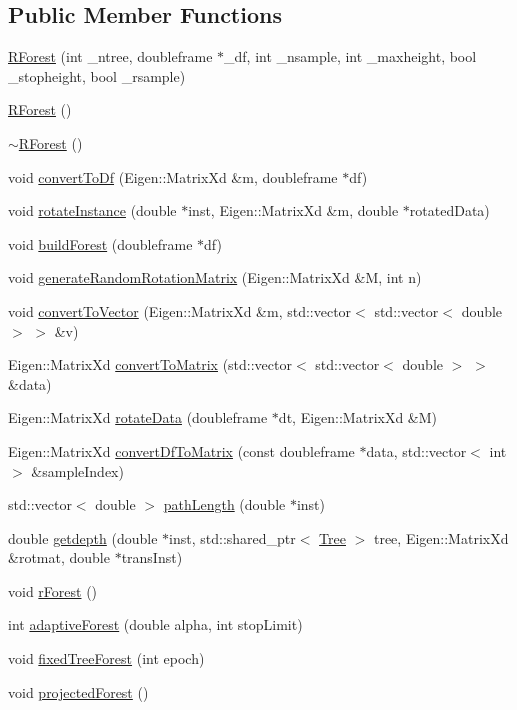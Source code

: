 \subsection*{Public Member Functions}
\begin{DoxyCompactItemize}
\item 
\hyperlink{classRForest_a3314b007aa19d928f56f4bbaf35fae10}{R\+Forest} (int \+\_\+ntree, doubleframe $\ast$\+\_\+df, int \+\_\+nsample, int \+\_\+maxheight, bool \+\_\+stopheight, bool \+\_\+rsample)
\item 
\hyperlink{classRForest_a6058c1b7beb5c90e59e558847b8650f6}{R\+Forest} ()
\item 
\hyperlink{classRForest_a873a1b941163b4cccda4bf83607226f3}{$\sim$\+R\+Forest} ()
\item 
void \hyperlink{classRForest_a0d8c5dbc04ec8433403f40d289d28100}{convert\+To\+Df} (Eigen\+::\+Matrix\+Xd \&m, doubleframe $\ast$df)
\item 
void \hyperlink{classRForest_a068f39ee76aa3ece35f110975303f07b}{rotate\+Instance} (double $\ast$inst, Eigen\+::\+Matrix\+Xd \&m, double $\ast$rotated\+Data)
\item 
void \hyperlink{classRForest_a7e8959b5b54b454f34ed68d60132e80f}{build\+Forest} (doubleframe $\ast$df)
\item 
void \hyperlink{classRForest_ab1f0edda495b87ef9286907d44f2f8ff}{generate\+Random\+Rotation\+Matrix} (Eigen\+::\+Matrix\+Xd \&M, int n)
\item 
void \hyperlink{classRForest_ada11eb452d05c98cd481b9080a5703a3}{convert\+To\+Vector} (Eigen\+::\+Matrix\+Xd \&m, std\+::vector$<$ std\+::vector$<$ double $>$ $>$ \&v)
\item 
Eigen\+::\+Matrix\+Xd \hyperlink{classRForest_ad132bc186056d96d8979fbe238afe529}{convert\+To\+Matrix} (std\+::vector$<$ std\+::vector$<$ double $>$ $>$ \&data)
\item 
Eigen\+::\+Matrix\+Xd \hyperlink{classRForest_af149cda8d70a254ff0968d350f85b59d}{rotate\+Data} (doubleframe $\ast$dt, Eigen\+::\+Matrix\+Xd \&M)
\item 
Eigen\+::\+Matrix\+Xd \hyperlink{classRForest_a17f0ad7b46a5bceff43411d4752002d3}{convert\+Df\+To\+Matrix} (const doubleframe $\ast$data, std\+::vector$<$ int $>$ \&sample\+Index)
\item 
std\+::vector$<$ double $>$ \hyperlink{classRForest_ad2631b9a85a04079c603b1c8296bdb9d}{path\+Length} (double $\ast$inst)
\item 
double \hyperlink{classRForest_a3ecb236540eade88548b9e7ace6f13a1}{getdepth} (double $\ast$inst, std\+::shared\+\_\+ptr$<$ \hyperlink{classTree}{Tree} $>$ tree, Eigen\+::\+Matrix\+Xd \&rotmat, double $\ast$trans\+Inst)
\item 
void \hyperlink{classRForest_af91b647289cd5631389cefbc2612f4b3}{r\+Forest} ()
\item 
int \hyperlink{classRForest_abc389cab7fa7ffee669b3add5aad4c52}{adaptive\+Forest} (double alpha, int stop\+Limit)
\item 
void \hyperlink{classRForest_af8c8c06e5875c4a2a539d38ec65c9a7e}{fixed\+Tree\+Forest} (int epoch)
\item 
void \hyperlink{classRForest_ab6d2b335db34e4845bebf8864cc4e0e1}{projected\+Forest} ()
\end{DoxyCompactItemize}
